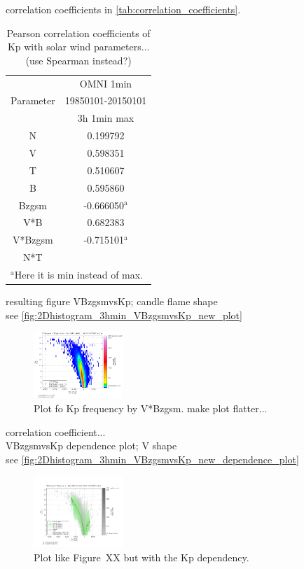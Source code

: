 correlation coefficients in \autoref{tab:correlation_coefficients}.
\begin{table}[htb]\small
	\centering
	\captionsetup{belowskip=4pt}
	\caption{Pearson correlation coefficients of Kp with solar wind parameters... (use Spearman instead?)}
	\begin{tabular}{cc}
		\toprule
			&OMNI 1min\\
		Parameter	&19850101-20150101\\
			&3h 1min max\\
		\midrule
		N	&0.199792\\
		V	&0.598351\\
		T	&0.510607\\
		B	&0.595860\\
		Bzgsm	&-0.666050$^\text{a}$\\
		V*B	&0.682383\\
		V*Bzgsm	&-0.715101$^\text{a}$\\
		N*T	&\\
		\bottomrule
		\multicolumn{2}{l}{\footnotesize{$^\text{a}$Here it is min instead of max.}}
	\end{tabular}
	\label{tab:correlation_coefficients}
\end{table}


resulting figure VBzgsmvsKp; candle flame shape\\
see \autoref{fig:2Dhistogram_3hmin_VBzgsmvsKp_new_plot}
\begin{figure}[htb]
	\centering
	\includegraphics[width=0.3\textwidth]{images/gnuplots/2Dhistogram_3hmin_VBzgsmvsKp_new_plot.png}
	\caption{Plot fo Kp frequency by V*Bzgsm. make plot flatter...}
	\label{fig:2Dhistogram_3hmin_VBzgsmvsKp_new_plot}
\end{figure}

correlation coefficient...\\

VBzgsmvsKp dependence plot; V shape\\
see \autoref{fig:2Dhistogram_3hmin_VBzgsmvsKp_new_dependence_plot}
\begin{figure}[htb]
	\centering
	\includegraphics[width=0.3\textwidth]{images/gnuplots/2Dhistogram_3hmin_VBzgsmvsKp_new_dependence_plot.png}
	\caption{Plot like Figure~XX but with the Kp dependency.}
	\label{fig:2Dhistogram_3hmin_VBzgsmvsKp_new_dependence_plot}
\end{figure}

